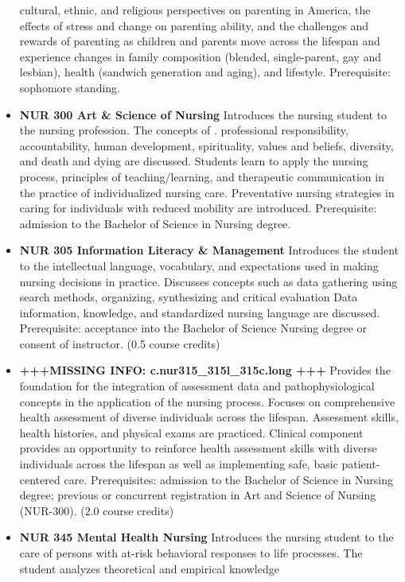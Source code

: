 \documentclass[
  letterpaper,
]{scrbook}
\begin{document}
\begin{itemize}
  cultural, ethnic, and religious perspectives on parenting in America,
  the effects of stress and change on parenting ability, and the
  challenges and rewards of parenting as children and parents move
  across the lifespan and experience changes in family composition
  (blended, single-parent, gay and lesbian), health (sandwich generation
  and aging), and lifestyle. Prerequisite: sophomore standing.
\item
  \textbf{NUR 300 Art \& Science of Nursing} Introduces the nursing
  student to the nursing profession. The concepts of . professional
  responsibility, accountability, human development, spirituality,
  values and beliefs, diversity, and death and dying are discussed.
  Students learn to apply the nursing process, principles of
  teaching/learning, and therapeutic communication in the practice of
  individualized nursing care. Preventative nursing strategies in caring
  for individuals with reduced mobility are introduced. Prerequisite:
  admission to the Bachelor of Science in Nursing degree.
\item
  \textbf{NUR 305 Information Literacy \& Management} Introduces the
  student to the intellectual language, vocabulary, and expectations
  used in making nursing decisions in practice. Discusses concepts such
  as data gathering using search methods, organizing, synthesizing and
  critical evaluation Data information, knowledge, and standardized
  nursing language are discussed. Prerequisite: acceptance into the
  Bachelor of Science Nursing degree or consent of instructor. (0.5
  course credits)
\item
  \textbf{+++MISSING INFO: c.nur315\_315l\_315c.long +++} Provides the
  foundation for the integration of assessment data and
  pathophysiological concepts in the application of the nursing process.
  Focuses on comprehensive health assessment of diverse individuals
  across the lifespan. Assessment skills, health histories, and physical
  exams are practiced. Clinical component provides an opportunity to
  reinforce health assessment skills with diverse individuals across the
  lifespan as well as implementing safe, basic patient-centered care.
  Prerequisites: admission to the Bachelor of Science in Nursing degree;
  previous or concurrent registration in Art and Science of Nursing
  (NUR-300). (2.0 course credits)
\item
  \textbf{NUR 345 Mental Health Nursing} Introduces the nursing student
  to the care of persons with at-risk behavioral responses to life
  processes. The student analyzes theoretical and empirical knowledge

\end{itemize}
\end{document}
